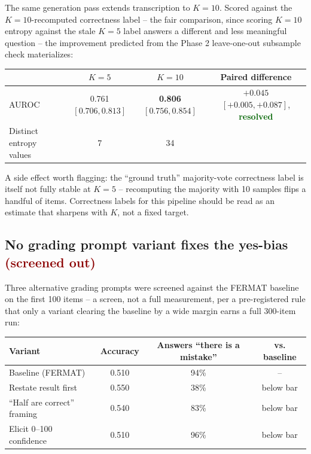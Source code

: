 \documentclass[11pt]{article}
\newcommand{\worked}[1]{\textcolor{darkgreen}{\textbf{#1}}}
\newcommand{\failed}[1]{\textcolor{darkred}{\textbf{#1}}}
\begin{document}
The same generation pass extends transcription to $K=10$. Scored against the
$K=10$-recomputed correctness label -- the fair comparison, since scoring
$K=10$ entropy against the stale $K=5$ label answers a different and less
meaningful question -- the improvement predicted from the Phase 2
leave-one-out subsample check materializes:

\begin{center}
\begin{tabular}{lccc}
\toprule
& $K=5$ & $K=10$ & Paired difference \\
\midrule
AUROC & 0.761 $[0.706, 0.813]$ & \textbf{0.806} $[0.756, 0.854]$ & $+0.045$ $[+0.005, +0.087]$, \worked{resolved} \\
Distinct entropy values & 7 & 34 & \\
\bottomrule
\end{tabular}
\end{center}

A side effect worth flagging: the ``ground truth'' majority-vote correctness
label is itself not fully stable at $K=5$ -- recomputing the majority with 10
samples flips a handful of items. Correctness labels for this pipeline should
be read as an estimate that sharpens with $K$, not a fixed target.

\subsection{No grading prompt variant fixes the yes-bias \failed{(screened out)}}
\label{sec:prompt-variants}

Three alternative grading prompts were screened against the FERMAT baseline on
the first 100 items -- a screen, not a full measurement, per a pre-registered
rule that only a variant clearing the baseline by a wide margin earns a full
300-item run:

\begin{center}
\begin{tabular}{lccc}
\toprule
Variant & Accuracy & Answers ``there is a mistake'' & vs. baseline \\
\midrule
Baseline (FERMAT) & 0.510 & 94\% & -- \\
Restate result first & 0.550 & 38\% & below bar \\
``Half are correct'' framing & 0.540 & 83\% & below bar \\
Elicit 0--100 confidence & 0.510 & 96\% & below bar \\
\bottomrule
\end{tabular}
\end{center}
\end{document}
